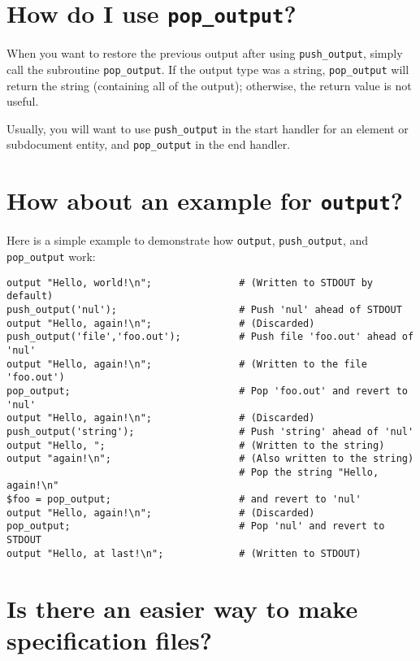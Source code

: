\section{How do I use {\tt pop\_output}?}
\label{POPOUTPUT}


When you want to restore the previous output after using {\tt push\_output}, simply
call the subroutine {\tt pop\_output}.  If the output type
was a string, {\tt pop\_output} will return the string
(containing all of the output); otherwise, the return value is not
useful.

Usually, you will want to use {\tt push\_output} in
the start handler for an element or subdocument entity, and
{\tt pop\_output} in the end handler.




\section{How about an example for {\tt output}?}
\label{OUTPUTEX}


Here is a simple example to demonstrate how {\tt output}, {\tt push\_output}, and
{\tt pop\_output} work:

{\footnotesize\begin{verbatim}
output "Hello, world!\n";               # (Written to STDOUT by default)
push_output('nul');                     # Push 'nul' ahead of STDOUT
output "Hello, again!\n";               # (Discarded)
push_output('file','foo.out');          # Push file 'foo.out' ahead of 'nul'
output "Hello, again!\n";               # (Written to the file 'foo.out')
pop_output;                             # Pop 'foo.out' and revert to 'nul'
output "Hello, again!\n";               # (Discarded)
push_output('string');                  # Push 'string' ahead of 'nul'
output "Hello, ";                       # (Written to the string)
output "again!\n";                      # (Also written to the string)
                                        # Pop the string "Hello, again!\n"
$foo = pop_output;                      # and revert to 'nul'
output "Hello, again!\n";               # (Discarded)
pop_output;                             # Pop 'nul' and revert to STDOUT
output "Hello, at last!\n";             # (Written to STDOUT)
\end{verbatim}}




\section{Is there an easier way to make specification files?}
\label{SKEL}


